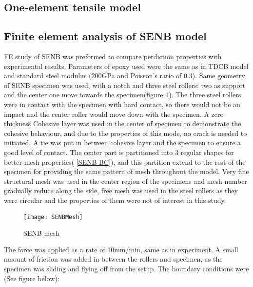 \documentclass[numbers=noendperiod,chapterprefix=on]{icldt} %
\begin{document}
\subsection{One-element tensile model} \label{FE_tensile_model}

\subsection{Finite element analysis of SENB model}
FE study of SENB was preformed to compare perdiction properties with experimental results. Parameters of epoxy used were the same as in TDCB model and standard steel modulus (200GPa and Poisson's ratio of 0.3). Same geometry of SENB specimen was used, with a notch and three steel rollers: two as support and the center one move towards the specimen(figure \ref{SENBMesh}). The three steel rollers were in contact with the specimen with hard contact, so there would not be an impact and the center roller would move down with the specimen. A zero thickness Cohesive layer was used in the center of specimen to demonstrate the cohesive behaviour, and due to the properties of this mode, no crack is needed to initiated. A tie was put in between cohesive layer and the specimen to ensure a good level of contact.
The center part is partitioned into 3 regular shapes for better mesh properties( \ref{SENB-BC}), and this partition extend to the rest of the specimen for providing the same pattern of mesh throughout the model. Very fine structural mesh was used in the center region of the specimens and mesh number gradually reduce along the side, free mesh was used in the steel rollers as they were circular and the properties of them were not of interest in this study.

\begin{figure}[!t]
\centering
\texttt{[image: SENBMesh]}
\caption{SENB mesh}\label{SENBMesh}
\end{figure}
\FloatBarrier

The force was applied as a rate of 10mm/min, same as in experiment. A small amount of friction was added in between the rollers and specimen, as the specimen was sliding and flying off from the setup.\newline
The boundary conditions were (See figure below): %
\end{document}
